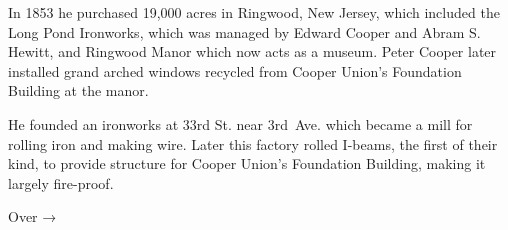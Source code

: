 \documentclass{article}
\begin{document}
\begin{minipage}[t]{0.46\linewidth}
\begin{enumList}
\item In 1853 he purchased 19,000 acres in Ringwood, New Jersey, which
included the {\mdseries Long Pond Ironworks}, which was managed by Edward
Cooper and Abram S. Hewitt, and {\mdseries Ringwood Manor} which now acts as a
museum. Peter Cooper later installed {\mdseries grand arched windows recycled
from Cooper Union's Foundation Building} at the manor.

\item He founded an ironworks at 33rd St. near 3rd~Ave. which became a mill
for rolling iron and making wire. Later this factory {\mdseries rolled
I-beams}, the first of their kind, to provide structure for {\mdseries Cooper
Union's Foundation Building}, making it largely {\mdseries fire-proof}.

\setcounter{enumTemp}{\value{enumListi}}
\end{enumList}
\end{minipage}
\vspace*{\fill}

\hfill Over { →}

\newpage{}
\end{document}

